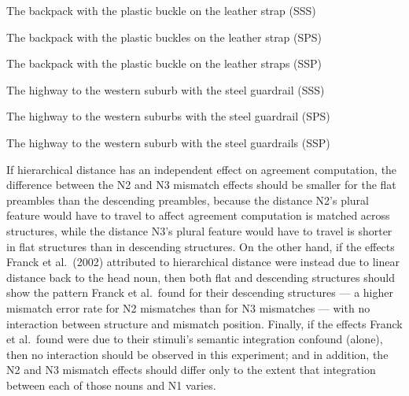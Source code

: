 \documentclass[12pt,titlepage]{article}
\begin{document}
\begin{myexample}
\label{desc}
\begin{examples}
    
    \item \label{desc-sss} The backpack with the plastic buckle on the 
    leather strap \hfill (SSS)\hspace{6em}
    
    \item \label{desc-sps}The backpack with the plastic buckles on the 
    leather strap \hfill (SPS)\hspace{6em}
    
    \item \label{desc-ssp} The backpack with the plastic buckle on the 
    leather straps \hfill (SSP)\hspace{6em}
    
\end{examples}
\end{myexample}
\vspace{-1\baselineskip}

\begin{myexample}
\label{flat}
\begin{examples}
    
    \item \label{flat-sss} The highway to the western suburb with the steel
    guardrail \hfill (SSS)\hspace{6em}
    
    \item \label{flat-sps} The highway to the western suburbs with the 
    steel guardrail \hfill (SPS)\hspace{6em}
    
    \item \label{flat-ssp} The highway to the western suburb with the steel
    guardrails \hfill (SSP)\hspace{6em}
    
\end{examples}
\end{myexample}

If hierarchical distance has an independent effect on agreement
computation, the difference between the N2 and N3 mismatch effects should
be smaller for the flat preambles than the descending preambles, because
the distance N2's plural feature would have to travel to affect agreement
computation is matched across structures, while the distance N3's plural
feature would have to travel is shorter in flat structures than in
descending structures.  On the other hand, if the effects Franck et al.\
(2002) attributed to hierarchical distance were instead due to linear
distance back to the head noun, then both flat and descending structures
should show the pattern Franck et al.\ found for their descending
structures --- a higher mismatch error rate for N2 mismatches than for N3
mismatches --- with no interaction between structure and mismatch position.
Finally, if the effects Franck et al.\ found were due to their stimuli's
semantic integration confound (alone), then no interaction should be
observed in this experiment; and in addition, the N2 and N3 mismatch
effects should differ only to the extent that integration between each of
those nouns and N1 varies.
\end{document}
